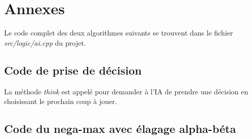 \chapter{Annexes}

Le code complet des deux algorithmes suivants se trouvent dans le fichier \emph{src/logic/ai.cpp} du projet.

\section{Code de prise de décision}\label{src:think}



La méthode \emph{think} est appelé pour demander à l'IA de prendre une décision en choisissant le prochain coup à
jouer.

\section{Code du nega-max avec élagage alpha-béta}\label{src:negamax}



